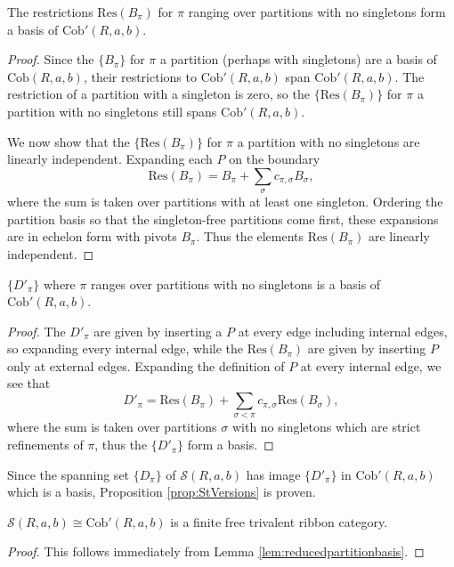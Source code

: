 \documentclass[12pt]{amsart}
\begin{document}
\begin{lemma}
    The restrictions $\mathrm{Res}(B_\pi)$ for $\pi$ ranging over partitions with no singletons form a basis of $\mathrm{Cob}'(R,a,b)$.
\end{lemma}
\begin{proof}
    Since the $\{B_\pi\}$ for $\pi$ a partition (perhaps with singletons) are a basis of $\mathrm{Cob}(R,a,b)$, their restrictions to $\mathrm{Cob}'(R,a,b)$ span $\mathrm{Cob}'(R,a,b)$. The restriction of a partition with a singleton is zero, so the $\{\mathrm{Res}(B_\pi)\}$ for $\pi$ a partition with no singletons still spans $\mathrm{Cob}'(R,a,b)$. 
    
    We now show that the $\{\mathrm{Res}(B_\pi)\}$ for $\pi$ a partition with no singletons are linearly independent. Expanding each $P$ on the boundary
     \[
    \mathrm{Res}(B_\pi)
      = B_\pi +
        \sum_{\sigma}
        c_{\pi,\sigma} B_\sigma,
    \]
    where the sum is taken over partitions with at least one singleton. Ordering the partition basis so that the singleton-free partitions come first, these expansions are in echelon form with pivots $B_\pi$. Thus the elements $\mathrm{Res}(B_\pi)$ are linearly independent.
\end{proof}

\begin{lemma} \label{lem:reducedpartitionbasis}
     $\{D'_\pi\}$ where $\pi$ ranges over partitions with no singletons is a basis of $\mathrm{Cob}'(R,a,b)$.
\end{lemma}
\begin{proof}
    The $D'_\pi$ are given by inserting a $P$ at every edge including internal edges, so expanding every internal edge, while the $\mathrm{Res}(B_\pi)$ are given by inserting $P$ only at external edges. Expanding the definition of $P$ at every internal edge, we see that 
    \[
    D'_\pi
      = \mathrm{Res}(B_\pi) +
        \sum_{\sigma < \pi}
        c_{\pi,\sigma}\mathrm{Res}(B_\sigma),
    \]
    where the sum is taken over partitions $\sigma$ with no singletons which are strict refinements of $\pi$, thus the $\{D'_\pi\}$ form a basis.
\end{proof}

Since the spanning set $\{D_\pi\}$ of $\mathcal{S}(R,a,b)$ has image $\{D'_\pi\}$ in $\mathrm{Cob}'(R,a,b)$ which is a basis, Proposition \ref{prop:StVersions} is proven.

\begin{corollary}
    $\mathcal{S}(R,a,b) \cong \mathrm{Cob}'(R,a,b)$ is a finite free trivalent ribbon category.
\end{corollary}
\begin{proof}
    This follows immediately from Lemma \ref{lem:reducedpartitionbasis}.
\end{proof}
\end{document}
